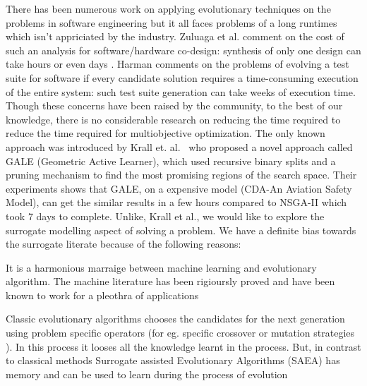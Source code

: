 \documentclass{newsig}
\begin{document}
There has been numerous work on applying evolutionary techniques on the problems in software engineering but it all faces problems of a long runtimes which isn't appriciated by the industry. Zuluaga et al. \cite{zuluaga2013active} comment on the cost of such an analysis for
software/hardware co-design: \textquotedbl synthesis of only one
design can take hours or even days \textquotedbl. Harman \cite{harman2012search} comments
on the problems of evolving a test suite for software
if every candidate solution requires a time-consuming
execution of the entire system: such test suite generation
can take weeks of execution time. Though these concerns have been raised by the community, to the best of our knowledge, there is no considerable research on reducing the time required to reduce the time required for multiobjective optimization. The only known approach was introduced by Krall et. al.~\cite{krall2014gale}  who proposed a novel approach called GALE (Geometric Active Learner), which used recursive binary splits and a pruning mechanism to find the most promising regions of the search space. Their experiments shows that GALE, on a expensive model (CDA-An Aviation Safety Model), can get the similar results in a few hours compared to NSGA-II which took 7 days to complete. Unlike, Krall et al., we would like to explore the surrogate modelling aspect of solving a problem. We have a definite bias towards the surrogate literate because of the following reasons:
\begin{compactitem}
\item{It is a harmonious marraige between machine learning and evolutionary algorithm. The machine literature has been rigioursly proved and have been known to work for a pleothra of applications}
\item{Classic evolutionary algorithms chooses the candidates for the next generation using problem specific operators (for eg. specific crossover or mutation strategies \cite{koziolek2011peropteryx}). In this process it looses all the knowledge learnt in the process. But, in contrast to classical methods Surrogate assisted Evolutionary Algorithms (SAEA) has memory and can be used to learn during the process of evolution}
\end{compactitem}
\end{document}
